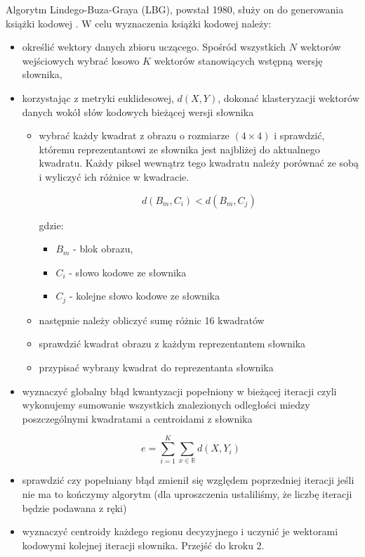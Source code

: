 \documentclass{article}
\begin{document}
Algorytm Lindego-Buza-Graya (LBG), powstał 1980, służy on do generowania książki kodowej \cite{lbg1980}. W celu wyznaczenia książki kodowej należy:

\begin{itemize} 
  \item określić wektory danych zbioru uczącego. Spośród wszystkich $N$ wektorów wejściowych
        wybrać losowo $K$ wektorów stanowiących wstępną wersję słownika,
  \item korzystając z metryki euklidesowej, $d(X,Y)$, dokonać klasteryzacji wektorów danych wokół słów kodowych bieżącej wersji słownika
        \begin{itemize}
          \item wybrać każdy kwadrat z obrazu o rozmiarze $(4 \times 4)$ i sprawdzić, któremu reprezentantowi ze słownika jest najbliżej do
                aktualnego kwadratu. Każdy piksel wewnątrz tego kwadratu należy porównać ze sobą i wyliczyć ich różnice w kwadracie.
                
                \begin{equation}
                  d(B_{m}, C_{i}) < d(B_{m}, C_{j})
                \end{equation}
                
                gdzie:
                \begin{itemize}[label=]
                  \item $B_{m}$ - blok obrazu,
                  \item $C_{i}$ - słowo kodowe ze słownika
                  \item $C_{j}$ - kolejne słowo kodowe ze słownika
                \end{itemize}
                
          \item następnie należy obliczyć sumę różnic 16 kwadratów
          \item sprawdzić kwadrat obrazu z każdym reprezentantem słownika
          \item przypisać wybrany kwadrat do reprezentanta słownika
        \end{itemize}
  \item wyznaczyć globalny błąd kwantyzacji popełniony w bieżącej iteracji czyli wykonujemy sumowanie wszystkich
        znalezionych odległości miedzy poszczególnymi kwadratami a centroidami z słownika
        
        \begin{equation}
          \label{eq:lbg_error}
          e = \sum_{i=1}^K \sum_{x\in\mathbb{R}} d(X, Y_{i}) 
        \end{equation}
        
  \item sprawdzić czy popełniany błąd zmienił się względem poprzedniej iteracji jeśli nie ma to kończymy algorytm
        (dla uproszczenia ustaliliśmy, że liczbę iteracji będzie podawana z ręki)
  \item wyznaczyć centroidy każdego regionu decyzyjnego i uczynić je wektorami kodowymi kolejnej iteracji słownika. Przejść do kroku 2.
\end{itemize}
\end{document}
